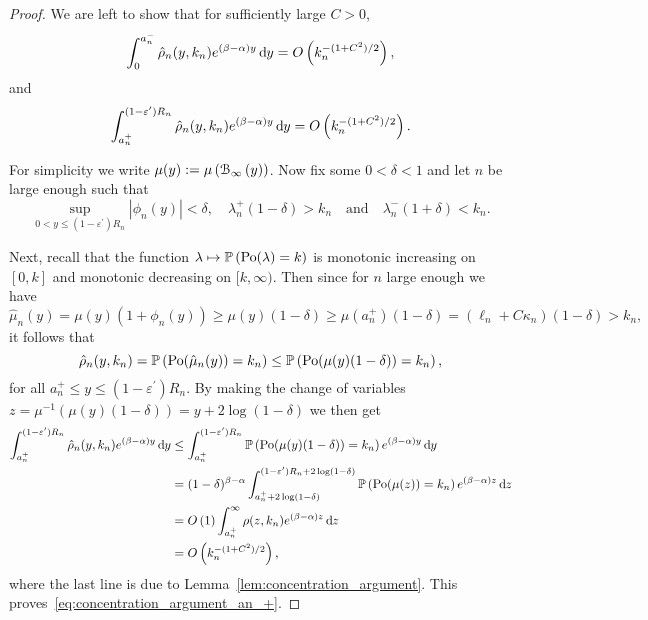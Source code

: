 \begin{proof}
We are left to show that for sufficiently large $C > 0$,
\begin{equation}\label{eq:concentration_argument_an_-}
	 \int_0^{a_n^-} \hat{\rho}_n(y,k_n) e^{(\beta-\alpha) y} \operatorname{\mathrm{d}\hspace{-2pt}} y = O\left(k_n^{-(1+C^2)/2}\right),
\end{equation}
and
\begin{equation}\label{eq:concentration_argument_an_+}
	\int_{a_n^+}^{(1-\varepsilon^\prime)R_n} \hat{\rho}_n(y,k_n) e^{(\beta-\alpha) y} \operatorname{\mathrm{d}\hspace{-2pt}} y = O\left(k_n^{-(1+C^2)/2}\right).
\end{equation}

For simplicity we write $\mu(y) := \mu\left({\mathcal B}_{\infty}\left(y\right)\right)$. Now fix some $0 < \delta < 1$ and let $n$ be large enough such that 
\[
\sup_{0 < y \le (1-\varepsilon^\prime)R_n} |\phi_n(y)| < \delta, \quad
\lambda_n^+(1 - \delta) > k_n \quad \text{and} \quad
\lambda_n^-(1 + \delta) < k_n.
\]

Next, recall that the function $\lambda \mapsto \mathbb{P}\left({\mathrm{Po}}(\lambda) = k\right)$ is monotonic increasing on $[0,k]$ and monotonic decreasing on $[k, \infty)$. Then since for $n$ large enough we have 
\[
	\hat{\mu}_n(y) = \mu(y)(1 + \phi_n(y)) \ge \mu(y)(1 - \delta) \ge \mu(a_n^+)(1 - \delta)
	= (\ell_n + C \kappa_n)(1 - \delta) > k_n,
\]
it follows that 
\[
	\hat{\rho}_n(y,k_n) = \mathbb{P}\left({\mathrm{Po}}(\hat{\mu}_n(y)) = k_n\right) \le \mathbb{P}\left({\mathrm{Po}}(\mu(y)(1-\delta)) = k_n\right),
\]
for all $a_n^+ \le y \le (1-\varepsilon^\prime)R_n$. By making the change of variables $z = \mu^{-1}(\mu(y)(1-\delta)) = y + 2 \log(1-\delta)$ we then get
\begin{align*}
	\int_{a_n^+}^{(1-\varepsilon^\prime)R_n} \hat{\rho}_n(y,k_n) e^{(\beta - \alpha)y} \operatorname{\mathrm{d}\hspace{-2pt}} y
	&\le \int_{a_n^+}^{(1-\varepsilon^\prime)R_n} \mathbb{P}\left({\mathrm{Po}}(\mu(y)(1-\delta)) = k_n\right) 
		e^{(\beta-\alpha) y} \operatorname{\mathrm{d}\hspace{-2pt}} y\\
	&= (1-\delta)^{\beta - \alpha} \int_{a_n^+ + 2\log(1-\delta)}^{(1-\varepsilon^\prime)R_n + 2\log(1-\delta)} 
		\mathbb{P}\left({\mathrm{Po}}(\mu(z)) = k_n\right) e^{(\beta - \alpha)z} \operatorname{\mathrm{d}\hspace{-2pt}} z\\
	&= O\left(1\right) \int_{a_n^+}^{\infty} \rho(z,k_n) e^{(\beta - \alpha)z} \operatorname{\mathrm{d}\hspace{-2pt}} z\\
	&= O\left(k_n^{-(1+C^2)/2}\right),
\end{align*}
where the last line is due to Lemma~\ref{lem:concentration_argument}. This proves~\eqref{eq:concentration_argument_an_+}.



\end{proof}
